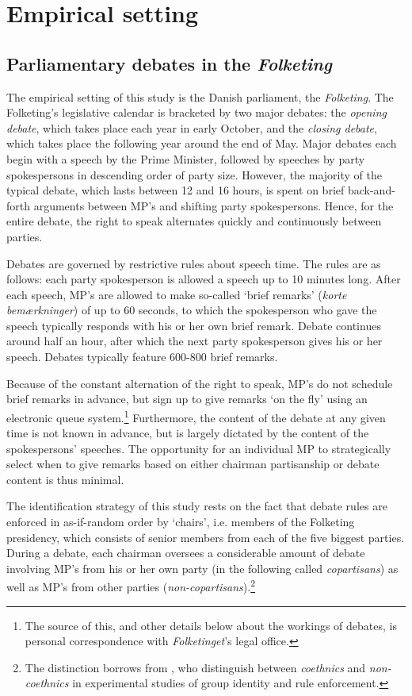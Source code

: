 \documentclass[12pt,a4paper]{article}
\begin{document}
\section{Empirical setting}\label{emp}

\subsection{Parliamentary debates in the \textit{Folketing}}
The empirical setting of this study is the Danish parliament, the \textit{Folketing}. The Folketing's legislative calendar is bracketed by two major debates: the \textit{opening debate}, which takes place each year in early October, and the \textit{closing debate}, which takes place the following year around the end of May. Major debates each begin with a speech by the Prime Minister, followed by speeches by party spokespersons in descending order of party size. However, the majority of the typical debate, which lasts between 12 and 16 hours, is spent on brief back-and-forth arguments between MP's and shifting party spokespersons. Hence, for the entire debate, the right to speak alternates quickly and continuously between parties. 

Debates are governed by restrictive rules about speech time. The rules are as follows: each party spokesperson is allowed a speech up to 10 minutes long. After each speech, MP's are allowed to make so-called `brief remarks' (\textit{korte bemærkninger}) of up to 60 seconds, to which the spokesperson who gave the speech typically responds with his or her own brief remark. Debate continues around half an hour, after which the next party spokesperson gives his or her speech. Debates typically feature 600-800 brief remarks. 

Because of the constant alternation of the right to speak, MP's do not schedule brief remarks in advance, but sign up to give remarks `on the fly' using an electronic queue system.\footnote{The source of this, and other details below about the workings of debates, is personal correspondence with \textit{Folketinget}'s legal office.} Furthermore, the content of the debate at any given time is not known in advance, but is largely dictated by the content of the spokespersons' speeches. The opportunity for an individual MP to strategically select when to give remarks based on either chairman partisanship or debate content is thus minimal.

The identification strategy of this study rests on the fact that debate rules are enforced in as-if-random order by `chairs', i.e. members of the Folketing presidency, which consists of senior members from each of the five biggest parties. During a debate, each chairman oversees a considerable amount of debate involving MP's from his or her own party (in the following called \textit{copartisans}) as well as MP's from other parties (\textit{non-copartisans}).\footnote{The distinction borrows from \cite{Habyarimana2007}, who distinguish between \textit{coethnics} and \textit{non-coethnics} in experimental studies of group identity and rule enforcement.} 
\end{document}
